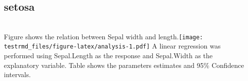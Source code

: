 \documentclass[
]{article}
\begin{document}
\hypertarget{setosa}{%
\subsection{setosa}\label{setosa}}

~\\
Figure shows the relation between Sepal width and
length.\texttt{[image: testrmd\_files/figure-latex/analysis-1.pdf]} A
linear regression was performed using Sepal.Length as the response and
Sepal.Width as the explanatory variable. Table shows the parameters
estimates and 95\% Confidence intervals.

\providecommand{\docline}[3]{\noalign{\global\setlength{\arrayrulewidth}{#1}}\arrayrulecolor[HTML]{#2}\cline{#3}}

\setlength{\tabcolsep}{2pt}

\renewcommand*{\arraystretch}{1.5}
\end{document}
